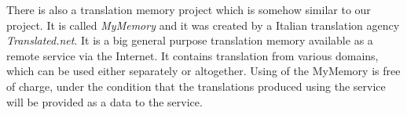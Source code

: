 There is also a translation memory project which is somehow similar to our project. It is called \emph{MyMemory} and it was created by a Italian translation agency \emph{Translated.net}. It is a big general purpose translation memory available as a remote service via the Internet. It contains translation from various domains, which can be used either separately or altogether. Using of the MyMemory is free of charge, under the condition that the translations produced using the service will be provided as a data to the service.
